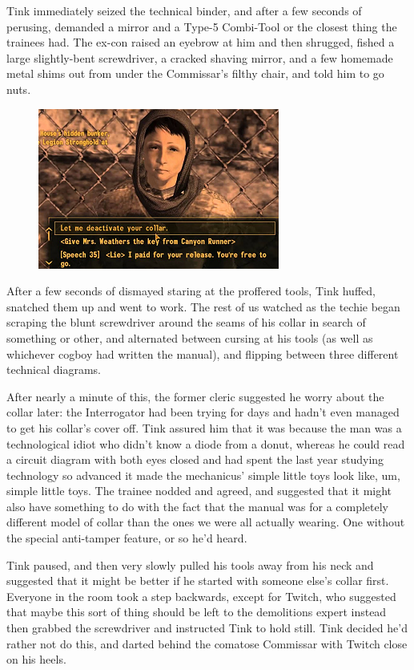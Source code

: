 Tink immediately seized the technical binder, and after a few seconds of perusing, demanded a mirror and a Type-5 Combi-Tool or the closest thing the trainees had. 
The ex-con raised an eyebrow at him and then shrugged, fished a large slightly-bent screwdriver, a cracked shaving mirror, and a few homemade metal shims out from under the Commissar's filthy chair, and told him to go nuts. 


\begin{figure}
	\begin{center}
		\includegraphics[width=\figwidth]{pics/21/15.png}
	\end{center}
\end{figure}
After a few seconds of dismayed staring at the proffered tools, Tink huffed, snatched them up and went to work. 
The rest of us watched as the techie began scraping the blunt screwdriver around the seams of his collar in search of something or other, and alternated between cursing at his tools (as well as whichever cogboy had written the manual), and flipping between three different technical diagrams. 


After nearly a minute of this, the former cleric suggested he worry about the collar later: 
the Interrogator had been trying for days and hadn't even managed to get his collar's cover off. 
Tink assured him that it was because the man was a technological idiot who didn't know a diode from a donut, whereas he could read a circuit diagram with both eyes closed and had spent the last year studying technology so advanced it made the mechanicus' simple little toys look like, um, simple little toys. 
The trainee nodded and agreed, and suggested that it might also have something to do with the fact that the manual was for a completely different model of collar than the ones we were all actually wearing. 
One without the special anti-tamper feature, or so he'd heard.

Tink paused, and then very slowly pulled his tools away from his neck and suggested that it might be better if he started with someone else's collar first. 
Everyone in the room took a step backwards, except for Twitch, who suggested that maybe this sort of thing should be left to the demolitions expert instead then grabbed the screwdriver and instructed Tink to hold still. 
Tink decided he'd rather not do this, and darted behind the comatose Commissar with Twitch close on his heels. 


